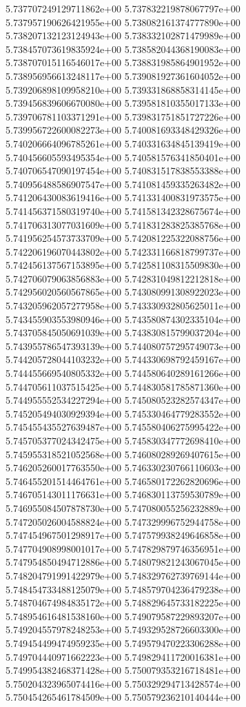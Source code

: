5.737707249129711862e+00
5.737832219878067797e+00
5.737957190626421955e+00
5.738082161374777890e+00
5.738207132123124943e+00
5.738332102871479989e+00
5.738457073619835924e+00
5.738582044368190083e+00
5.738707015116546017e+00
5.738831985864901952e+00
5.738956956613248117e+00
5.739081927361604052e+00
5.739206898109958210e+00
5.739331868858314145e+00
5.739456839606670080e+00
5.739581810355017133e+00
5.739706781103371291e+00
5.739831751851727226e+00
5.739956722600082273e+00
5.740081693348429326e+00
5.740206664096785261e+00
5.740331634845139419e+00
5.740456605593495354e+00
5.740581576341850401e+00
5.740706547090197454e+00
5.740831517838553388e+00
5.740956488586907547e+00
5.741081459335263482e+00
5.741206430083619416e+00
5.741331400831973575e+00
5.741456371580319740e+00
5.741581342328675674e+00
5.741706313077031609e+00
5.741831283825385768e+00
5.741956254573733709e+00
5.742081225322088756e+00
5.742206196070443802e+00
5.742331166818799737e+00
5.742456137567153895e+00
5.742581108315509830e+00
5.742706079063856883e+00
5.742831049812212818e+00
5.742956020560567865e+00
5.743080991308922023e+00
5.743205962057277958e+00
5.743330932805625011e+00
5.743455903553980946e+00
5.743580874302335104e+00
5.743705845050691039e+00
5.743830815799037204e+00
5.743955786547393139e+00
5.744080757295749073e+00
5.744205728044103232e+00
5.744330698792459167e+00
5.744455669540805332e+00
5.744580640289161266e+00
5.744705611037515425e+00
5.744830581785871360e+00
5.744955552534227294e+00
5.745080523282574347e+00
5.745205494030929394e+00
5.745330464779283552e+00
5.745455435527639487e+00
5.745580406275995422e+00
5.745705377024342475e+00
5.745830347772698410e+00
5.745955318521052568e+00
5.746080289269407615e+00
5.746205260017763550e+00
5.746330230766110603e+00
5.746455201514464761e+00
5.746580172262820696e+00
5.746705143011176631e+00
5.746830113759530789e+00
5.746955084507878730e+00
5.747080055256232889e+00
5.747205026004588824e+00
5.747329996752944758e+00
5.747454967501298917e+00
5.747579938249646858e+00
5.747704908998001017e+00
5.747829879746356951e+00
5.747954850494712886e+00
5.748079821243067045e+00
5.748204791991422979e+00
5.748329762739769144e+00
5.748454733488125079e+00
5.748579704236479238e+00
5.748704674984835172e+00
5.748829645733182225e+00
5.748954616481538160e+00
5.749079587229893207e+00
5.749204557978248253e+00
5.749329528726603300e+00
5.749454499474959235e+00
5.749579470223306288e+00
5.749704440971662223e+00
5.749829411720016381e+00
5.749954382468371428e+00
5.750079353216718481e+00
5.750204323965074416e+00
5.750329294713428574e+00
5.750454265461784509e+00
5.750579236210140444e+00
